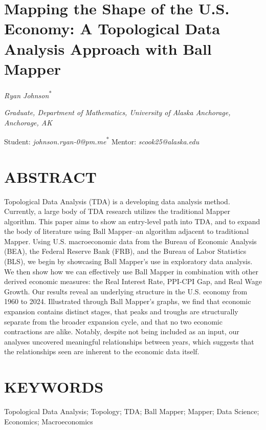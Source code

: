 \documentclass[
  10pt,
  letterpaper,
  DIV=11,
  numbers=noendperiod]{scrartcl}
\author{}
\date{}
\begin{document}
\section{Mapping the Shape of the U.S. Economy: A Topological Data
Analysis Approach with Ball
Mapper}\label{mapping-the-shape-of-the-u.s.-economy-a-topological-data-analysis-approach-with-ball-mapper}

\emph{Ryan Johnson}\textsuperscript{*}

\emph{Graduate, Department of Mathematics, University of Alaska
Anchorage, Anchorage, AK}

Student: \emph{johnson.ryan-0@pm.me}\textsuperscript{*} \newline Mentor:
\emph{scook25@alaska.edu}

\section{ABSTRACT}\label{abstract}

Topological Data Analysis (TDA) is a developing data analysis method.
Currently, a large body of TDA research utilizes the traditional Mapper
algorithm. This paper aims to show an entry-level path into TDA, and to
expand the body of literature using Ball Mapper--an algorithm adjacent
to traditional Mapper. Using U.S. macroeconomic data from the Bureau of
Economic Analysis (BEA), the Federal Reserve Bank (FRB), and the Bureau
of Labor Statistics (BLS), we begin by showcasing Ball Mapper's use in
exploratory data analysis. We then show how we can effectively use Ball
Mapper in combination with other derived economic measures: the Real
Interest Rate, PPI-CPI Gap, and Real Wage Growth. Our results reveal an
underlying structure in the U.S. economy from 1960 to 2024. Illustrated
through Ball Mapper's graphs, we find that economic expansion contains
distinct stages, that peaks and troughs are structurally separate from
the broader expansion cycle, and that no two economic contractions are
alike. Notably, despite not being included as an input, our analyses
uncovered meaningful relationships between years, which suggests that
the relationships seen are inherent to the economic data itself.

\section{KEYWORDS}\label{keywords}

Topological Data Analysis; Topology; TDA; Ball Mapper; Mapper; Data
Science; Economics; Macroeconomics
\end{document}
